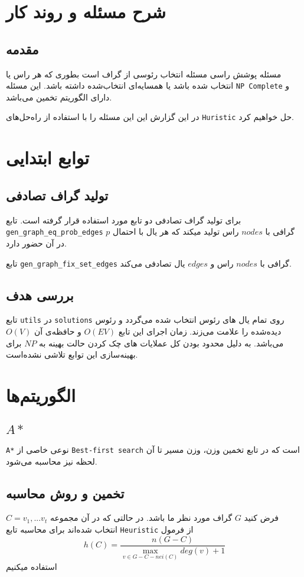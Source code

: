 \chapter{شرح مسئله و روند کار}

\section{مقدمه}
مسئله پوشش راسی مسئله انتخاب رئوسی از گراف است بطوری که هر راس یا انتخاب شده باشد یا همسایه‌ای انتخاب‌شده داشته باشد. این مسئله
\verb;NP Complete;
و دارای  الگوریتم تخمین می‌باشد.


در این گزارش این این مسئله را با استفاده از راه‌حل‌های 
\verb;Huristic;
حل خواهیم کرد.

\chapter{توابع ابتدایی}
\section{تولید گراف تصادفی}
برای تولید گراف تصادفی دو تابع مورد استفاده قرار گرفته است.
تابع
\verb;gen_graph_eq_prob_edges;
گرافی با
$nodes$
راس تولید میکند که هر یال با احتمال
$p$
در آن حضور دارد.


تابع
\verb;gen_graph_fix_set_edges;
گرافی با
$nodes$
راس و  
$edges$
یال تصادفی می‌کند.

\section{بررسی هدف}
تابع
\verb;utils;
در 
\verb;solutions;
 روی تمام یال ‌های رئوس انتخاب شده می‌گردد  و رئوس دیده‌شده را علامت می‌زند.
 زمان اجرای این تابع
 $O(EV)$
 و حافظه‌ی آن
 $O(V)$
  می‌باشد.
 به دلیل محدود بودن کل عملایات های چک کردن حالت بهینه به
 $NP$
 برای بهینه‌سازی این توابع تلاشی نشده‌است.

\chapter{الگوریتم‌ها}
\section{$A*$}
\verb;A*;
نوعی خاصی از
\verb;Best-first search;
است که در تابع تخمین وزن، وزن مسیر تا آن لحظه نیز محاسبه می‌شود.
\section{تخمین و روش محاسبه}
فرض کنید
 $G$
 گراف مورد نظر ما باشد.
 در حالتی که در آن مجموعه
 ‌$C={v_{1},... v_{t}}$
  انتخاب شده‌اند
برای محاسبه تابع 
\verb;Heuristic;
از فرمول
\begin{equation}
\label{e01}
h(C) = \frac{n(G - C)}{\max\limits_{v \in {G - C - nei(C)}} {deg(v) + 1}}
\end{equation}
استفاده میکنیم
